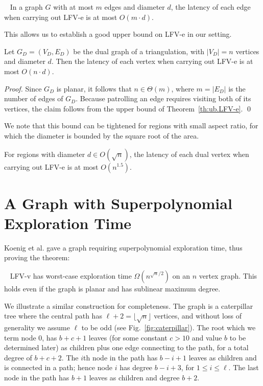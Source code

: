 \begin{theorem}
\label{th:ub.LFV-e}
~\cite{cik+-drwug-11} In a graph $G$ with at most $m$ edges and diameter $d$, the latency of each edge when carrying out
LFV-e is at most $O(m\cdot d)$.
\end{theorem}
This allows us to establish a good upper bound on LFV-e in our setting.
\begin{corollary}
\label{co:ub.LFV-e}
Let $G_D=(V_D,E_D)$ be the dual graph of a triangulation, with $|V_D|=n$ vertices and diameter $d$. Then
the latency of each vertex when carrying out LFV-e is at most $O(n\cdot d)$.
\end{corollary}

\begin{proof}
Since $G_D$ is planar, it follows that $n\in\Theta(m)$, where $m=|E_D|$ is the number of edges
of $G_D$. Because patrolling an edge requires visiting both of its vertices, the claim follows from the
upper bound of Theorem~\ref{th:ub.LFV-e}.
\qed
\end{proof}

We note that this bound can be tightened for regions with small aspect ratio, for which
the diameter is bounded by the square root of the area.

\begin{corollary}
\label{co:aspect}
For regions with diameter $d\in O(\sqrt{n})$, the
latency of each dual vertex when carrying out LFV-e is at most $O(n^{1.5})$.
\end{corollary}

\section{A Graph with Superpolynomial Exploration Time}

Koenig et al. gave a graph requiring superpolynomial exploration time, thus proving the theorem:
\begin{theorem}
\label{co:ub.LFV-v}~\cite{ksl+-ants-01}
LFV-v has worst-case exploration time $\Omega(n^{\sqrt{n}/2})$ on an $n$ vertex graph. This holds even
if the graph is planar and has sublinear maximum degree.
\end{theorem}
We illustrate a similar construction for completeness. The graph is a caterpillar tree where the central path has $\ell+2=\lfloor \sqrt{n} \rfloor$ vertices,
and without loss of generality we assume $\ell$ to be odd (see Fig.~\ref{fig:caterpillar}).
The root which we term node 0, has $b+c+1$ leaves (for some constant $c>10$ and value $b$ to be determined later)
as children plus one edge connecting to the path, for a total degree of $b+c+2$.
The $i$th node in the path has $b-i+1$ leaves as children and is connected
in a path; hence node $i$ has degree $b-i+3$, for $1\leq i \leq \ell$.
The last node in the path has $b+1$ leaves as children and degree $b+2$.

